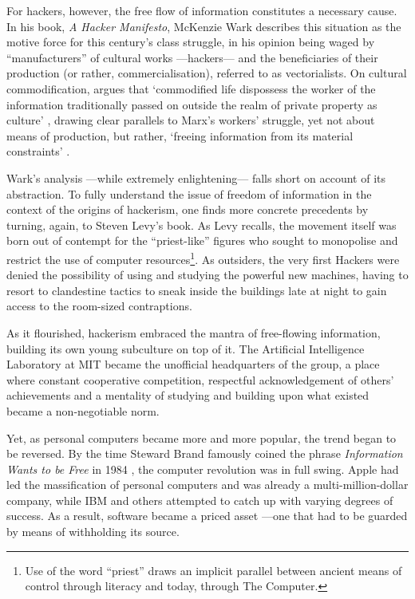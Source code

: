 For hackers, however, the free flow of information constitutes a necessary cause. In his book, \textit{A Hacker Manifesto}, McKenzie Wark \citeyearpar{wark04} describes this situation as the motive force for this century's class struggle, in his opinion being waged by ``manufacturers'' of cultural works ---hackers--- and the beneficiaries of their production (or rather, commercialisation), referred to as vectorialists. On cultural commodification, \citeauthor{wark04} argues that `commodified life dispossess the worker of the information traditionally passed on outside the realm of private property as culture' \citep[v. 28]{wark04}, drawing clear parallels to Marx's workers' struggle, yet not about means of production, but rather, `freeing information from its material constraints' \citep[v.4]{wark04}.


Wark's analysis ---while extremely enlightening--- falls short on account of its abstraction. To fully understand the issue of freedom of information in the context of the origins of hackerism, one finds more concrete precedents by turning, again, to Steven Levy's book.  As Levy \citep[p.5]{levy84} recalls, the movement itself was born out of contempt for the ``priest-like'' figures who sought to monopolise and restrict the use of computer resources\footnote{Use of the word ``priest'' draws an implicit parallel between ancient means of control through literacy and today, through The Computer.}. As outsiders, the very first Hackers were denied the possibility of using and studying the powerful new machines, having to resort to clandestine tactics to sneak inside the buildings late at night to gain access to the room-sized contraptions. 

As it flourished, hackerism embraced the mantra of free-flowing information, building its own young subculture on top of it. The Artificial Intelligence Laboratory at MIT became the unofficial headquarters of the group, a place where constant cooperative competition, respectful acknowledgement of others' achievements and a mentality of studying and building upon what existed became a non-negotiable norm.

Yet, as personal computers became more and more popular, the trend began to be reversed. By the time Steward Brand famously coined the phrase \textit{Information Wants to be Free} in 1984 \citep{wagner03}, the computer revolution was in full swing. Apple had led the massification of personal computers and was already a multi-million-dollar company, while IBM and others attempted to catch up with varying degrees of success. As a result, software became a priced asset ---one that had to be guarded by means of withholding its source.

